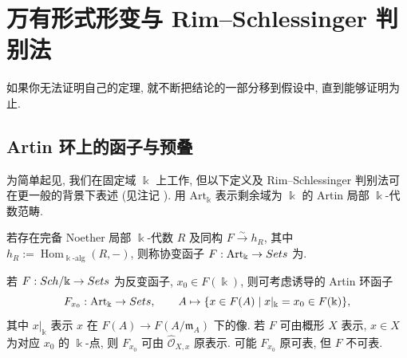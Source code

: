 \section{万有形式形变与 Rim--Schlessinger 判别法}\label{src:C.4}
\begin{epigraph}
如果你无法证明自己的定理, 就不断把结论的一部分移到假设中, 直到能够证明为止.
\end{epigraph}
\subsection{Artin 环上的函子与预叠}\label{src:C.4.1-subsection}
为简单起见, 我们在固定域 $\Bbbk$ 上工作, 但以下定义及 Rim--Schlessinger 判别法可在更一般的背景下表述 (见注记 ). 用 $\mathrm{Art}_{\Bbbk}$ 表示剩余域为 $\Bbbk$ 的 Artin 局部 $\Bbbk$-代数范畴.
\begin{definition}[原可表性]\label{src:C.4.1}
若存在完备 Noether 局部 $\Bbbk$-代数 $R$ 及同构 $F\xrightarrow{\sim}h_R$, 其中 $h_R:=\operatorname{Hom}_{\Bbbk\text{-}\mathrm{alg}}(R,-)$, 则称协变函子 $F:\mathrm{Art}_{\Bbbk}\to Sets$ 为.
\end{definition}
若 $F:Sch/\Bbbk\to Sets$ 为反变函子, $x_0\in F(\Bbbk)$, 则可考虑诱导的 Artin 环函子
\[
F_{x_0}:\mathrm{Art}_{\Bbbk}\to Sets,\qquad A\mapsto\{x\in F(A)\mid x|_{\Bbbk}=x_0\in F(\Bbbk)\},
\]
其中 $x|_{\Bbbk}$ 表示 $x$ 在 $F(A)\to F(A/\mathfrak m_A)$ 下的像. 若 $F$ 可由概形 $X$ 表示, $x\in X$ 为对应 $x_0$ 的 $\Bbbk$-点, 则 $F_{x_0}$ 可由 $\widehat{\mathcal O}_{X,x}$ 原表示. 可能 $F_{x_0}$ 原可表, 但 $F$ 不可表.

